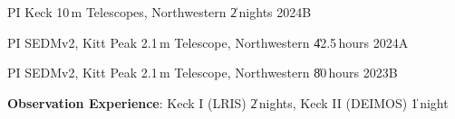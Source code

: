 \begin{cvpubs}

\end{cvpubs}





\begin{cventries}

\cvsimpentry
    {PI}
    {Keck 10\,m Telescopes, Northwestern \| 2\,nights}
    {2024B}
    {}

\cvsimpentry
	{PI}
	{SEDMv2, Kitt Peak 2.1\,m Telescope, Northwestern \| 42.5\,hours}
	{2024A}
	{} 

\cvsimpentry
	{PI}
	{SEDMv2, Kitt Peak 2.1\,m Telescope, Northwestern \| 80\,hours}
	{2023B}
	{}




\cvpub
{ %
{\bf\color{darktext} Observation Experience}: Keck I (LRIS) \| 2\,nights, Keck II (DEIMOS) \| 1\,night
}


\end{cventries}